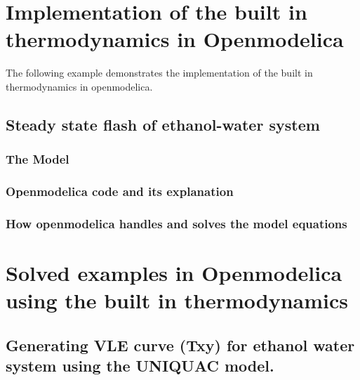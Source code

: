 \documentclass[12pt]{report}
\begin{document}
\chapter{Implementation of the built in thermodynamics in Openmodelica}
The following example demonstrates the implementation of the built in thermodynamics in openmodelica.

\section{Steady state flash of ethanol-water system}
\subsection{The Model}
\subsection{Openmodelica code and its explanation}
\subsection{How openmodelica handles and solves the model equations}


\chapter{Solved examples in Openmodelica using the built in thermodynamics}

\section{Generating VLE curve (Txy) for ethanol water system using the UNIQUAC model.}
\end{document}
